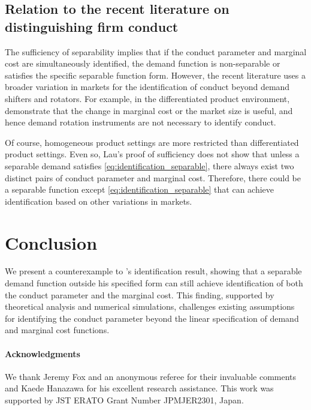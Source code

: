 \documentclass[11pt, a4paper]{article}
\theoremstyle{remark}
\begin{document}
\subsection{Relation to the recent literature on distinguishing firm conduct}

The sufficiency of separability implies that if the conduct parameter and marginal cost are simultaneously identified, the demand function is non-separable or satisfies the specific separable function form.
However, the recent literature uses a broader variation in markets for the identification of conduct beyond demand shifters and rotators.
For example, in the differentiated product environment, \citet{berry2014identification} demonstrate that the change in marginal cost or the market size is useful, and hence demand rotation instruments are not necessary to identify conduct.

Of course, homogeneous product settings are more restricted than differentiated product settings.
Even so, Lau's proof of sufficiency does not show that unless a separable demand satisfies  \eqref{eq:identification_separable}, there always exist two distinct pairs of conduct parameter and marginal cost.
Therefore, there could be a separable function except \eqref{eq:identification_separable} that can achieve identification based on other variations in markets.



\section{Conclusion}

We present a counterexample to \citet{lau1982identifying}'s identification result, showing that a separable demand function outside his specified form can still achieve identification of both the conduct parameter and the marginal cost. This finding, supported by theoretical analysis and numerical simulations, challenges existing assumptions for identifying the conduct parameter beyond the linear specification of demand and marginal cost functions.

\paragraph{Acknowledgments}
We thank Jeremy Fox and an anonymous referee for their invaluable comments and Kaede Hanazawa for his excellent research assistance.
This work was supported by JST ERATO Grant Number JPMJER2301, Japan.  
\end{document}
